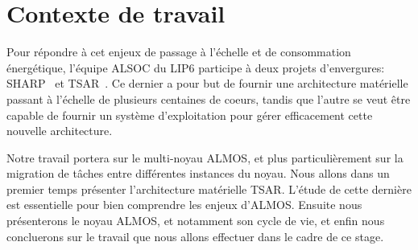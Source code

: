 \chapter{Contexte de travail}
\label{sec:context}

  

  Pour répondre à cet enjeux de passage à l'échelle et de consommation
  énergétique, l'équipe ALSOC du LIP6 participe à deux projets d'envergures:
  SHARP~\cite{sharp2012} et TSAR~\cite{tsar2008}. Ce dernier a pour but de
  fournir une architecture matérielle passant à l'échelle de plusieurs centaines
  de coeurs, tandis que l'autre se veut être capable de fournir un système
  d'exploitation pour gérer efficacement cette nouvelle architecture.

  Notre travail portera sur le multi-noyau ALMOS, et plus particulièrement sur
  la migration de tâches entre différentes instances du noyau. Nous allons dans
  un premier temps présenter l'architecture matérielle TSAR. L'étude de cette
  dernière est essentielle pour bien comprendre les enjeux d'ALMOS. Ensuite nous
  présenterons le noyau ALMOS, et notamment son cycle de vie, et enfin nous
  concluerons sur le travail que nous allons effectuer dans le cadre de ce
  stage.
  

